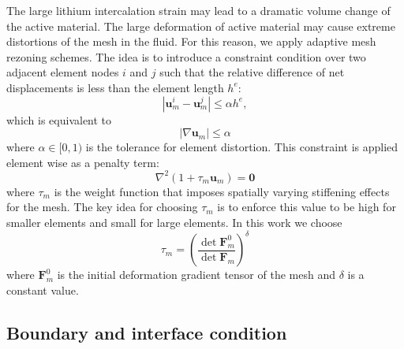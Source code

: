 The large lithium intercalation strain may lead to a dramatic volume change of the active material. The large deformation of active material may cause extreme distortions of the mesh in the fluid. For this reason, we apply adaptive mesh rezoning schemes. The idea is to introduce a constraint condition over two adjacent element nodes $i$ and $j$ such that the relative difference of net displacements is less than the element length $h^e$\-: \[ |\boldsymbol{u}_m^i-\boldsymbol{u}_m^j|\le\alpha h^e, \] which is equivalent to \[ |\nabla\boldsymbol{u}_m|\le\alpha \] where $\alpha\in[0,1)$ is the tolerance for element distortion. This constraint is applied element wise as a penalty term\-: \[ \nabla^2(1+\tau_m\boldsymbol{u}_m)=\boldsymbol{0} \] where $\tau_m$ is the weight function that imposes spatially varying stiffening effects for the mesh. The key idea for choosing $\tau_m$ is to enforce this value to be high for smaller elements and small for large elements. In this work we choose \[ \tau_m=\left(\frac{\det \boldsymbol{F}_m^0}{\det \boldsymbol{F}_m} \right)^\delta \] where $\boldsymbol{F}_m^0$ is the initial deformation gradient tensor of the mesh and $\delta$ is a constant value.\hypertarget{battery_particle_subsection3}{}\subsection{Boundary and interface condition}\label{battery_particle_subsection3}
